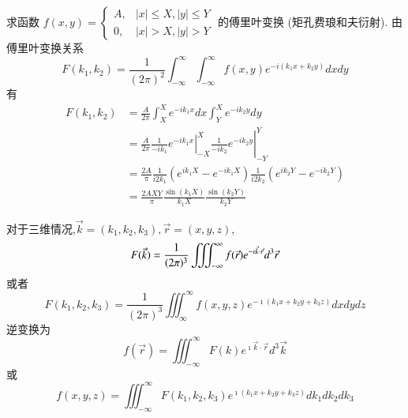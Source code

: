 \begin{examplebox}{
    求函数 $f(x, y)= \begin{cases}A, & |x| \leq X,|y| \leq Y \\ 0, & |x|>X,|y|>Y\end{cases}$ 的傅里叶变换 (矩孔费琅和夫衍射).
}
由傅里叶变换关系
$$
F\left(k_1, k_2\right)=\frac{1}{(2 \pi)^2} \int_{-\infty}^{\infty} \int_{-\infty}^{\infty} f(x, y) e^{-i\left(k_1 x+k_2 y\right)} d x d y
$$
有
$$
\begin{aligned}
F\left(k_1, k_2\right) & =\frac{A}{2 \pi} \int_X^X e^{-i k_1 x} d x \int_Y^X e^{-i k_2 y} d y \\
& =\left.\left.\frac{A}{2 \pi} \frac{1}{-i k_1} e^{-i k_1 x}\right|_{-X} ^X \frac{1}{-i k_2} e^{-i k_2 y}\right|_{-Y} ^Y \\
& =\frac{2A}{\pi} \frac{1}{i 2 k_1}\left(e^{i k_1 X}-e^{-i k_1 X}\right) \frac{1}{i 2 k_2}\left(e^{i k_2 Y}-e^{-i k_2 Y}\right) \\
& =\frac{2A X Y}{\pi} \frac{\sin \left(k_1 X\right)}{k_1 X} \frac{\sin \left(k_2 Y\right)}{k_2 Y}
\end{aligned}
$$
\end{examplebox}

对于三维情况,$\vec{k}=\left(k_1, k_2, k_3\right), \vec{r}=(x, y, z)$,
\begin{equation}
    F(\vec{k})=\frac{1}{(2 \pi)^3} \iiint_{-\infty}^{\infty} f(\vec{r}) e^{-\imath  \vec{k} \cdot \vec{r}} d^3 \vec{r} \\
\end{equation}
或者
\begin{equation}
    F\left(k_1, k_2, k_3\right)=\frac{1}{(2 \pi)^3} \iiint_{\infty}^{\infty} f(x, y, z) e^{-\imath\left(k_1 x+k_2 y+k_3 z\right)} d x d y d z 
\end{equation}
逆变换为
\begin{equation}
     f(\vec{r})=\iiint_{-\infty}^{\infty} F(k) e^{\imath \vec{k} \cdot \vec{r}} d^3 \vec{k} 
\end{equation}  
或
\begin{equation}
f(x, y, z)=\iiint_{-\infty}^{\infty} F\left(k_1, k_2, k_3\right) e^{\imath\left(k_1 x+k_2 y+k_3 z\right)} d k_1 d k_2 d k_3 
\end{equation} 